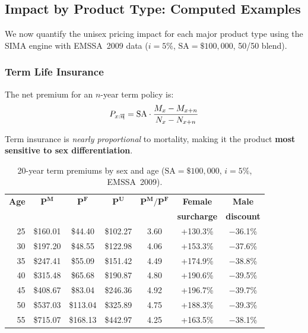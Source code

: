 \documentclass[12pt,a4paper]{article}
\newcommand{\Nx}[1]{N_{#1}}
\newcommand{\Mx}[1]{M_{#1}}
\newcommand{\SA}{\text{SA}}
\newcommand{\anmark}[1]{\overline{#1}\mkern-3.5mu|}
\begin{document}
\subsection{Impact by Product Type: Computed Examples}
\label{subsec:impact-product}

We now quantify the unisex pricing impact for each major product type using the
SIMA engine with EMSSA~2009 data ($i = 5\%$, $\SA = \$100{,}000$, 50/50 blend).

\subsubsection{Term Life Insurance}

The net premium for an $n$-year term policy is:
\begin{equation}
  P_{x:\anmark{n}} = \SA \cdot \frac{\Mx{x} - \Mx{x+n}}{\Nx{x} - \Nx{x+n}}
\end{equation}

Term insurance is \emph{nearly proportional} to mortality, making it the product
\textbf{most sensitive to sex differentiation}.

\begin{table}[H]
\centering
\caption{20-year term premiums by sex and age ($\SA = \$100{,}000$, $i = 5\%$,
EMSSA~2009).}
\label{tab:term-premiums}
\begin{tabular}{rcccccc}
\toprule
\textbf{Age} & $\bm{P^M}$ & $\bm{P^F}$ & $\bm{P^U}$ &
$\bm{P^M/P^F}$ & \textbf{Female} & \textbf{Male} \\
 & & & & & \textbf{surcharge} & \textbf{discount} \\
\midrule
25 & \$160.01 & \$44.40  & \$102.27 & 3.60 & +130.3\% & $-$36.1\% \\
30 & \$197.20 & \$48.55  & \$122.98 & 4.06 & +153.3\% & $-$37.6\% \\
35 & \$247.41 & \$55.09  & \$151.42 & 4.49 & +174.9\% & $-$38.8\% \\
40 & \$315.48 & \$65.68  & \$190.87 & 4.80 & +190.6\% & $-$39.5\% \\
45 & \$408.67 & \$83.04  & \$246.36 & 4.92 & +196.7\% & $-$39.7\% \\
50 & \$537.03 & \$113.04 & \$325.89 & 4.75 & +188.3\% & $-$39.3\% \\
55 & \$715.07 & \$168.13 & \$442.97 & 4.25 & +163.5\% & $-$38.1\% \\
\bottomrule
\end{tabular}
\end{table}
\end{document}
